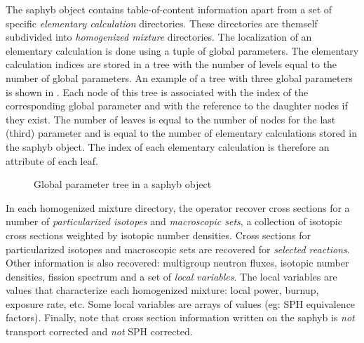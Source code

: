 The {\sc saphyb} object contains table-of-content information apart from a set of specific
{\sl elementary calculation} directories. These directories are themself subdivided
into {\sl homogenized mixture} directories. The localization of an elementary calculation
is done using a tuple of global parameters. The elementary calculation indices are
stored in a tree with the number of levels equal to the number of global parameters.
An example of a tree with three global parameters is shown in . Each node
of this tree is associated with the index of the corresponding global parameter and with the
reference to the daughter nodes if they exist. The number of leaves is equal to the number
of nodes for the last (third) parameter and is equal to the number of elementary
calculations stored in the {\sc saphyb} object. The index of each elementary calculation is
therefore an attribute of each leaf.

\begin{figure}[h!]  
\begin{center} 
\epsfxsize=12cm
\centerline{ }
\parbox{14cm}{\caption{Global parameter tree in a {\sc saphyb} object}\label{fig:tree}}   
\end{center}  
\end{figure}

\vskip 0.1cm

In each homogenized mixture directory, the  operator recover
cross sections for a number of {\sl particularized isotopes} and {\sl macroscopic
sets}, a collection of isotopic cross sections weighted by isotopic number densities.
Cross sections for particularized isotopes and macroscopic sets are recovered for
{\sl selected reactions}. Other information is also recovered: multigroup neutron
fluxes, isotopic number densities, fission spectrum and a set
of {\sl local variables}. The local variables are values that characterize each
homogenized mixture: local power, burnup, exposure rate, etc. Some local variables
are arrays of values (eg: SPH equivalence factors). Finally, note that cross section
information written on the {\sc saphyb} is {\sl not} transport corrected and {\sl not}
SPH corrected.

\vskip 0.1cm

